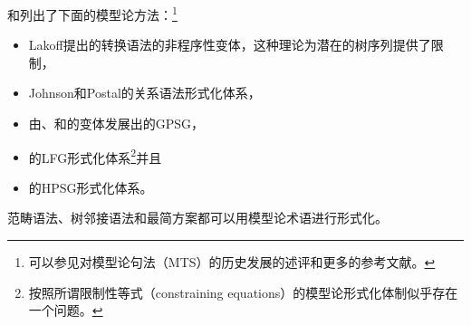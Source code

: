 \citet[--20]{PS2001a}和\citet{Pullum2007a}列出了下面的模型论方法：\footnote{
可以参见对模型论句法（MTS）的历史发展的述评和更多的参考文献。  
}
\begin{itemize}
\item Lakoff提出的转换语法的非程序性变体，这种理论为潜在的树序列提供了限制，
\item Johnson和Postal的关系语法形式化体系\citeyearpar{JP80a-u}，
\item 由\citet{GPCKHL88a}、\citet{BGM93a-u}和\citet{Rogers97a}的变体发展出的GPSG\indexgpsgc，
\item \citet{Kaplan95a}的LFG\indexlfgc 形式化体系\footnote{
 按照\citet[\S~3.2]{Pullum2013a}所谓限制性等式（constraining equations）的模型论形式化体制似乎存在一个问题。
}并且
\item \citet{King99a-u}的HPSG\indexhpsgc 形式化体系。
\end{itemize}
范畴语法\indexcgc\citep{BvN94a-u}、树邻接语法\indextagc\citep{RVS94a-u}和最简方案\indexmpc\citep{Veenstra98a}都可以用模型论术语进行形式化。

